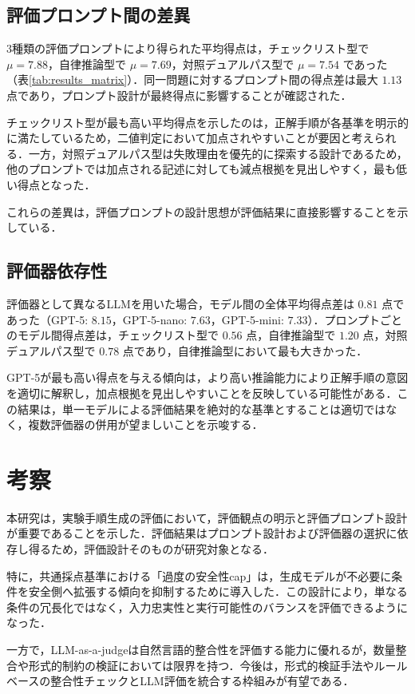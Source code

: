 \documentclass[twocolumn]{jarticle}
\begin{document}
\subsection{評価プロンプト間の差異}
3種類の評価プロンプトにより得られた平均得点は，チェックリスト型で $\mu = 7.88$，自律推論型で $\mu = 7.69$，対照デュアルパス型で $\mu = 7.54$ であった（表\ref{tab:results_matrix}）．同一問題に対するプロンプト間の得点差は最大 $1.13$ 点であり，プロンプト設計が最終得点に影響することが確認された．

チェックリスト型が最も高い平均得点を示したのは，正解手順が各基準を明示的に満たしているため，二値判定において加点されやすいことが要因と考えられる．一方，対照デュアルパス型は失敗理由を優先的に探索する設計であるため，他のプロンプトでは加点される記述に対しても減点根拠を見出しやすく，最も低い得点となった．

これらの差異は，評価プロンプトの設計思想が評価結果に直接影響することを示している．

\subsection{評価器依存性}
評価器として異なるLLMを用いた場合，モデル間の全体平均得点差は $0.81$ 点であった（GPT-5: $8.15$，GPT-5-nano: $7.63$，GPT-5-mini: $7.33$）．プロンプトごとのモデル間得点差は，チェックリスト型で $0.56$ 点，自律推論型で $1.20$ 点，対照デュアルパス型で $0.78$ 点であり，自律推論型において最も大きかった．

GPT-5が最も高い得点を与える傾向は，より高い推論能力により正解手順の意図を適切に解釈し，加点根拠を見出しやすいことを反映している可能性がある．この結果は，単一モデルによる評価結果を絶対的な基準とすることは適切ではなく，複数評価器の併用が望ましいことを示唆する．

\section{考察}

本研究は，実験手順生成の評価において，評価観点の明示と評価プロンプト設計が重要であることを示した．評価結果はプロンプト設計および評価器の選択に依存し得るため，評価設計そのものが研究対象となる．

特に，共通採点基準における「過度の安全性cap」は，生成モデルが不必要に条件を安全側へ拡張する傾向を抑制するために導入した．この設計により，単なる条件の冗長化ではなく，入力忠実性と実行可能性のバランスを評価できるようになった．

一方で，LLM-as-a-judgeは自然言語的整合性を評価する能力に優れるが，数量整合や形式的制約の検証においては限界を持つ．今後は，形式的検証手法やルールベースの整合性チェックとLLM評価を統合する枠組みが有望である．
\end{document}
